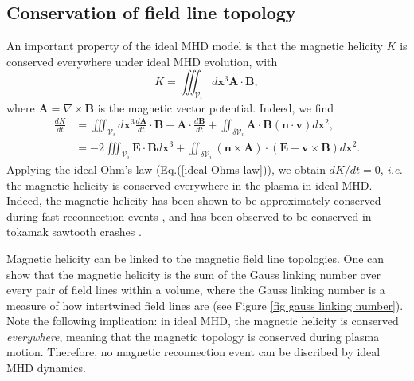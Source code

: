 \documentclass[my_thesis.tex]{subfiles}
\begin{document}
\subsection{Conservation of field line topology}
An important property of the ideal MHD model is that the magnetic helicity $K$ is conserved everywhere under ideal MHD evolution, with
\begin{equation}
	K = \iiint_{\mathcal{V}_i} d\mathbf{x}^3 \mathbf{A} \cdot \mathbf{B},
\end{equation}
where $\mathbf{A}=\nabla\times\mathbf{B}$ is the magnetic vector potential. Indeed, we find
\begin{align}
	\frac{dK}{dt} &= \iiint_{\mathcal{V}_i} d\mathbf{x}^3 \frac{d\mathbf{A}}{dt}\cdot\mathbf{B} + \mathbf{A}\cdot\frac{d\mathbf{B}}{dt} + \iint_{\delta\mathcal{V}_i} \mathbf{A}\cdot\mathbf{B}(\mathbf{n}\cdot\mathbf{v})d\mathbf{x}^2, \\
	&= -2\iiint_{\mathcal{V}_i}\mathbf{E}\cdot\mathbf{B} d\mathbf{x}^3 + \iint_{\delta\mathcal{V}_i}(\mathbf{n}\times\mathbf{A})\cdot(\mathbf{E}+\mathbf{v}\times\mathbf{B})d\mathbf{x}^2.
\end{align}
Applying the ideal Ohm's law (Eq.(\ref{ideal Ohms law})), we obtain $dK/dt = 0$, \textit{i.e.} the magnetic helicity is conserved everywhere in the plasma in ideal MHD. Indeed, the magnetic helicity has been shown to be approximately conserved during fast reconnection events \citep{bergerIntroductionMagneticHelicity1999}, and has been observed to be conserved in tokamak sawtooth crashes \citep{Heidbrink2000}. 

Magnetic helicity can be linked to the magnetic field line topologies. One can show \citep{moffattDegreeKnottednessTangled1969, arnoldTopologicalPropertiesMagnetic1998, bergerIntroductionMagneticHelicity1999} that the magnetic helicity is the sum of the Gauss linking number over every pair of field lines within a volume, where the Gauss linking number is a measure of how intertwined field lines are (see Figure \ref{fig gauss linking number}). Note the following implication: in ideal MHD, the magnetic helicity is conserved \emph{everywhere}, meaning that the magnetic topology is conserved during plasma motion. Therefore, no magnetic reconnection event can be discribed by ideal MHD dynamics.
\end{document}

